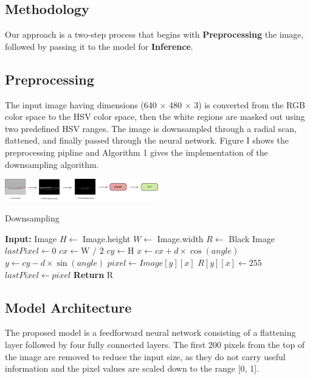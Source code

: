 \documentclass[a4paper]{article}
\begin{document}
\begin{multicols}{2}
\section{Methodology}
\par \noindent Our approach is a two-step process that begins with \textbf{Preprocessing} the image,
followed by passing it to the model for \textbf{Inference}.
\subsection{Preprocessing}
\par \noindent The input image having dimensions (640 $\times$ 480 $\times$ 3) is converted from the RGB color space to the HSV color space, then the white regions are masked out using two predefined HSV ranges.
The image is downsampled through a radial scan, flattened, and finally passed through the neural network.
Figure I shows the preprocessing pipline and Algorithm 1 gives the implementation of the downsampling algorithm.

\par \noindent

{ \centering
  \includegraphics[width=0.5\textwidth]{results/Flowchart.png}\\
  \label{fig:flowchart}
}
\begin{algorithm}[H]
  \caption{Downsampling}
\begin{algorithmic}[1]
\Statex \textbf{Input: }Image
\State $H \gets$ Image.height
\State $W \gets$ Image.width
\State $R \gets$ Black Image
    \State $lastPixel \gets 0$
    \State $cx \gets \text{W / 2}$
    \State $cy \gets \text{H}$
        \State $x \gets cx + d \times \cos(angle)$
        \State $y \gets cy - d \times \sin(angle)$
          \State $pixel \gets Image[y][x]$
            \State $R[y][x] \gets 255 $ 
          \EndIf
          \State $lastPixel \gets pixel$
        \EndIf
    \EndFor
\EndFor
\State \textbf{Return} R
\end{algorithmic}
\end{algorithm}

\subsection{Model Architecture}
\par \noindent
The proposed model is a feedforward neural network consisting of a flattening layer followed 
by four fully connected layers. The first 200 pixels from the top of the image are removed 
to reduce the input size, as they do not carry useful information and the pixel values are scaled
down to the range [0, 1].


\end{multicols}
\end{document}

